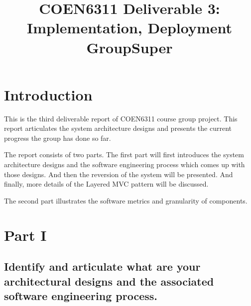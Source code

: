 \documentclass[conference]{IEEEtran}
\begin{document}
\title{COEN6311 Deliverable 3: \\
	Implementation, Deployment\\
	GroupSuper
}

\author{
	\and
	\and

}

\maketitle

\section{Introduction}

This is the third deliverable report of COEN6311 course group project.
This report articulates the system architecture designs and presents the current progress the group has done so far.

The report consists of two parts.
The first part will first introduces the system architecture designs and the software engineering process which comes up with those designs.
And then the reversion of the system will be presented.
And finally, more details of the Layered MVC pattern will be discussed.

The second part illustrates the software metrics and granularity of components.

\section{Part I}

\subsection{Identify and articulate what are your architectural designs and the associated
	software engineering process.
}
\label{sec:1.1}
\end{document}
